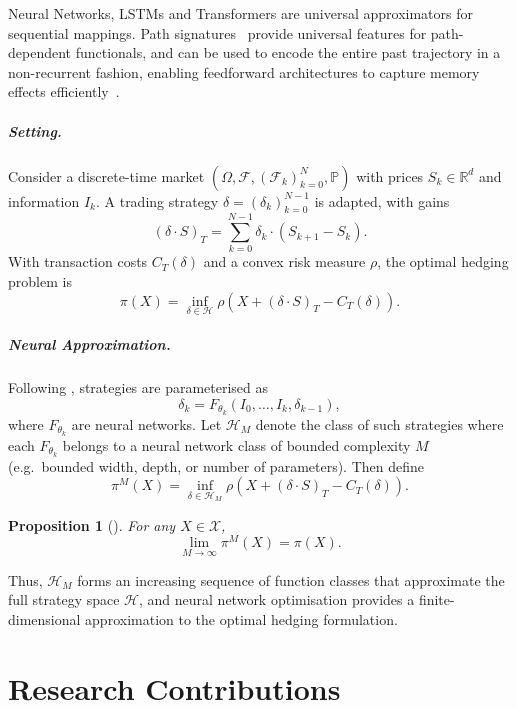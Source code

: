 \documentclass[11pt,oneside]{report}
\newtheorem{proposition}{Proposition}[chapter]
\begin{document}
Neural Networks, LSTMs and Transformers are universal approximators for sequential mappings. Path signatures~\citep{lyons1998differential} provide universal features for path-dependent functionals, and can be used to encode the entire past trajectory in a non-recurrent fashion, enabling feedforward architectures to capture memory effects efficiently~\citep{abijaber2023hedging}.

\paragraph{Setting.}
Consider a discrete-time market $(\Omega,\mathcal{F},(\mathcal{F}_k)_{k=0}^N,\mathbb{P})$ with prices $S_k \in \mathbb{R}^d$ and information $I_k$. A trading strategy $\delta=(\delta_k)_{k=0}^{N-1}$ is adapted, with gains
\[
(\delta \cdot S)_T = \sum_{k=0}^{N-1} \delta_k \cdot (S_{k+1}-S_k).
\]
With transaction costs $C_T(\delta)$ and a convex risk measure $\rho$, the optimal hedging problem is
\[
\pi(X) = \inf_{\delta \in \mathcal{H}} 
\rho\!\left(X + (\delta \cdot S)_T - C_T(\delta)\right).
\]

\paragraph{Neural Approximation.}
Following \citet{buehler2019deep}, strategies are parameterised as
\[
\delta_k = F_{\theta_k}(I_0,\dots,I_k,\delta_{k-1}),
\]
where $F_{\theta_k}$ are neural networks. Let $\mathcal{H}_M$ denote the class of such strategies where each $F_{\theta_k}$ belongs to a neural network class of bounded complexity $M$ (e.g.\ bounded width, depth, or number of parameters). Then define
\[
\pi^M(X) = \inf_{\delta \in \mathcal{H}_M}
\rho\!\left(X + (\delta \cdot S)_T - C_T(\delta)\right).
\]

\begin{proposition}[\citet{buehler2019deep}]
For any $X \in \mathcal{X}$,
\[
\lim_{M \to \infty} \pi^M(X) = \pi(X).
\]
\end{proposition}

Thus, $\mathcal{H}_M$ forms an increasing sequence of function classes that approximate the full strategy space $\mathcal{H}$, and neural network optimisation provides a finite-dimensional approximation to the optimal hedging formulation.
\chapter{Research Contributions}
\label{sec:contributions}
\end{document}
